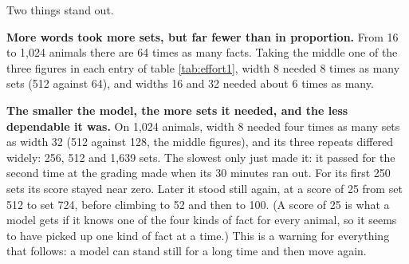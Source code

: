 Two things stand out.

\textbf{More words took more sets, but far fewer than in proportion.} From 16 to 1,024 animals
there are 64 times as many facts. Taking the middle one of the three figures in each entry of
table \ref{tab:effort1}, width 8 needed 8 times as many sets (512 against 64), and widths 16
and 32 needed about 6 times as many.

\textbf{The smaller the model, the more sets it needed, and the less dependable it was.} On
1,024 animals, width 8 needed four times as many sets as width 32 (512 against 128, the middle
figures), and its
three repeats differed widely: 256, 512 and 1,639 sets. The slowest only just made it: it
passed for the second time at the grading made when its 30 minutes ran out. For its first 250 sets its score stayed near zero. Later it stood still
again, at a score of 25 from set 512 to set 724, before climbing to 52 and then to 100. (A
score of 25 is what a model gets if it knows one of the four kinds of fact for every animal, so
it seems to have picked up one kind of fact at a time.) This is a warning for everything that
follows: a model can stand still for a long time and then move again.

